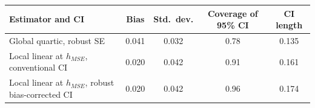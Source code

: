 \begin{tabular}{lcccc}\toprule
Estimator and CI & Bias & Std.\ dev. & Coverage of 95\% CI & CI length \\ \midrule
Global quartic, robust SE & 0.041 & 0.032 & 0.78 & 0.135 \\
Local linear at $h_{MSE}$, conventional CI & 0.020 & 0.042 & 0.91 & 0.161 \\
Local linear at $h_{MSE}$, robust bias-corrected CI & 0.020 & 0.042 & 0.96 & 0.174 \\
\bottomrule\end{tabular}
